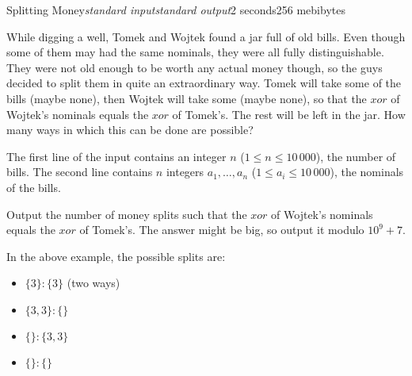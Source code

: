 \begin{problem}{Splitting Money}{\textsl{standard input}}{\textsl{standard output}}{2 seconds}{256 mebibytes}{}

While digging a well, Tomek and Wojtek found a jar full of old bills.
Even though some of them may had the same nominals, they were all fully distinguishable.
They were not old enough to be worth any actual money though, so the guys decided to split them in quite an extraordinary way.
Tomek will take some of the bills (maybe none), then Wojtek will take some (maybe none), so that the $xor$ of Wojtek's nominals equals the $xor$ of Tomek's.
The rest will be left in the jar.
How many ways in which this can be done are possible?

\InputFile
    The first line of the input contains an integer $n$ ($1 \leq n \leq 10\,000$), the number of bills.
	 The second line contains $n$ integers $a_1, \ldots, a_n$ ($1 \leq a_i \leq 10\,000$), the nominals of the bills.

\OutputFile
	Output the number of money splits such that the $xor$ of Wojtek's nominals equals the $xor$ of Tomek's.
	The answer might be big, so output it modulo $10^9+7$.

\Examples
\begin{example}
%
\end{example}

\Note

In the above example, the possible splits are:
\begin{itemize}
    \item $\{3\} : \{3\}$ (two ways)
    \item $\{3,3\} : \{\}$ 
    \item $\{\} : \{3,3\}$ 
    \item $\{\} : \{\}$ 
\end{itemize}

\end{problem}
